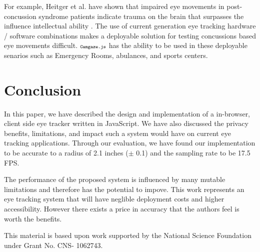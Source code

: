 \documentclass[annual]{acmsiggraph}
\newcommand{\Acronym}[1]{\ensuremath{{\small{\texttt{#1}}}}}
\newcommand{\Name}{\Acronym{Camgaze.js}} \newcommand{\False}{\Constant{false}}
\newcommand{\Constant}[1]{\ensuremath{\small{\texttt{#1}}}}
\begin{document}
For example, Heitger et al. have shown that impaired eye movements in
post-concussion syndrome patients indicate trauma on the brain that surpasses
the influence intellectual ability \cite{Heitger2009}. The use of current
generation eye tracking hardware / software combinations makes a deployable
solution for testing concussions based eye movements difficult. $\Name$ has the
ability to be used in these deployable senarios such as Emergency Rooms,
abulances, and sports centers.

\section{Conclusion}

In this paper, we have described the design and implementation of a in-browser,
client side eye tracker written in JavaScript. We have also discussed the
privacy benefits, limitations, and impact such a system would have on current
eye tracking applications. Through our evaluation, we have found our
implementation to be accurate to a radius of 2.1 inches ($\pm$ 0.1) and the
sampling rate to be 17.5 FPS.

The performance of the proposed system is influenced by many mutable
limitations and therefore has the potential to impove. This work represents an
eye tracking system that will have neglible deployment costs and higher
accessibility. However there exists a price in accuracy that the authors feel
is worth the benefits.

This material is based upon work supported by the National Science Foundation
under Grant No. CNS- 1062743.



\end{document}
